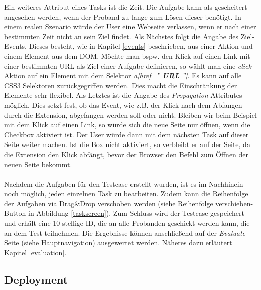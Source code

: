 \label{targetElem}
Ein weiteres Attribut eines Tasks ist die Zeit. Die Aufgabe kann als gescheitert angesehen werden, wenn der Proband zu lange zum Lösen dieser benötigt. In einem realen Szenario würde der User eine Webseite verlassen, wenn er nach einer bestimmten Zeit nicht an sein Ziel findet. Als Nächstes folgt die Angabe des Ziel-Events. Dieses besteht, wie in Kapitel \ref{events} beschrieben, aus einer Aktion und einem Element aus dem DOM. Möchte man bspw. den Klick auf einen Link mit einer bestimmten URL als Ziel einer Aufgabe definieren, so wählt man eine \textit{click}-Aktion auf ein Element mit dem Selektor \textit{a[href=''\textbf{ URL }'']}. Es kann auf alle CSS3 Selektoren zurückgegriffen werden. Dies macht die Einschränkung der Elemente sehr flexibel. Als Letztes ist die Angabe des \textit{Propagation}-Attributes möglich. Dies setzt fest, ob das Event, wie z.B. der Klick nach dem Abfangen durch die Extension, abgefangen werden soll oder nicht. Bleiben wir beim Beispiel mit dem Klick auf einen Link, so würde sich die neue Seite nur öffnen, wenn die Checkbox aktiviert ist. Der User würde dann mit dem nächsten Task auf dieser Seite weiter machen. Ist die Box nicht aktiviert, so verbleibt er auf der Seite, da die Extension den Klick abfängt, bevor der Browser den Befehl zum Öffnen der neuen Seite bekommt.\\
\\
Nachdem die Aufgaben für den Testcase erstellt wurden, ist es im Nachhinein noch möglich, jeden einzelnen Task zu bearbeiten. Zudem kann die Reihenfolge der Aufgaben via Drag\&Drop verschoben werden (siehe \glqq Reihenfolge verschieben\grqq{}-Button in Abbildung \ref{taskscreen}). Zum Schluss wird der Testcase gespeichert und erhält eine 10-stellige ID, die an alle Probanden geschickt werden kann, die an dem Test teilnehmen. Die Ergebnisse können anschließend auf der \textit{Evaluate} Seite (siehe Hauptnavigation) ausgewertet werden. Näheres dazu erläutert Kapitel \ref{evaluation}.


\subsection{Deployment}

